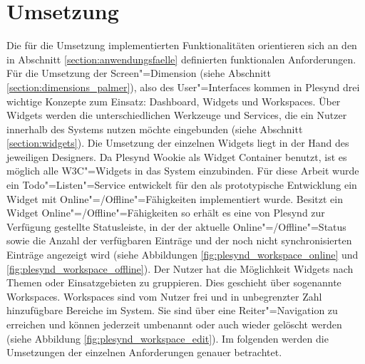 \section{Umsetzung}\label{section:umsetzung}
Die für die Umsetzung implementierten Funktionalitäten orientieren sich an den in Abschnitt \ref{section:anwendungsfaelle} definierten funktionalen Anforderungen. Für die Umsetzung der Screen"=Dimension (siehe Abschnitt \ref{section:dimensions_palmer}), also des User"=Interfaces kommen in Plesynd drei wichtige Konzepte zum Einsatz: Dashboard, Widgets und Workspaces. Über Widgets werden die unterschiedlichen Werkzeuge und Services, die ein Nutzer innerhalb des Systems nutzen möchte eingebunden (siehe Abschnitt \ref{section:widgets}). Die Umsetzung der einzelnen Widgets liegt in der Hand des jeweiligen Designers. Da Plesynd Wookie als Widget Container benutzt, ist es möglich alle W3C"=Widgets in das System einzubinden. Für diese Arbeit wurde ein Todo"=Listen"=Service entwickelt für den als prototypische Entwicklung ein Widget mit Online"=/Offline"=Fähigkeiten implementiert wurde. Besitzt ein Widget Online"=/Offline"=Fähigkeiten so erhält es eine von Plesynd zur Verfügung gestellte Statusleiste, in der der aktuelle Online"=/Offline"=Status sowie die Anzahl der verfügbaren Einträge und der noch nicht synchronisierten Einträge angezeigt wird (siehe Abbildungen \ref{fig:plesynd_workspace_online} und \ref{fig:plesynd_workspace_offline}). Der Nutzer hat die Möglichkeit Widgets nach Themen oder Einsatzgebieten zu gruppieren. Dies geschieht über sogenannte Workspaces. Workspaces sind vom Nutzer frei und in unbegrenzter Zahl hinzufügbare Bereiche im System. Sie sind über eine Reiter"=Navigation zu erreichen und können jederzeit umbenannt oder auch wieder gelöscht werden (siehe Abbildung \ref{fig:plesynd_workspace_edit}). Im folgenden werden die Umsetzungen der einzelnen Anforderungen genauer betrachtet.

